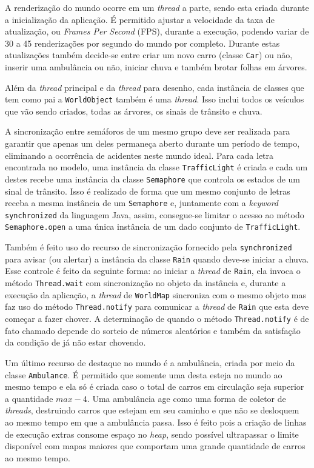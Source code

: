 A renderização do mundo ocorre em um \textit{thread} a parte, sendo
esta criada durante a inicialização da aplicação. É permitido ajustar
a velocidade da taxa de atualização, ou \textit{Frames Per Second} (FPS),
durante a execução, podendo variar de 30 a 45 renderizações por
segundo do mundo por completo. Durante estas atualizações também
decide-se entre criar um novo carro (classe \verb!Car!) ou não,
inserir uma ambulância ou não, iniciar chuva e também brotar folhas em
árvores.

Além da \textit{thread} principal e da \textit{thread} para desenho,
cada instância de classes que tem como pai a \verb!WorldObject! também
é uma \textit{thread}. Isso inclui todos os veículos que vão sendo
criados, todas as árvores, os sinais de trânsito e chuva.

A sincronização entre semáforos de um mesmo grupo deve ser realizada
para garantir que apenas um deles permaneça aberto durante um período
de tempo, eliminando a ocorrência de acidentes neste mundo ideal. Para
cada letra encontrada no modelo, uma instância da classe
\verb!TrafficLight! é criada e cada um destes recebe uma instância da
classe \verb!Semaphore! que controla os estados de um sinal de
trânsito. Isso é realizado de forma que um mesmo conjunto de letras
receba a mesma instância de um \verb!Semaphore! e, juntamente com a
\textit{keyword} \verb!synchronized! da linguagem Java, assim,
consegue-se limitar o acesso ao método \verb!Semaphore.open! a uma
única instância de um dado conjunto de \verb!TrafficLight!.

Também é feito uso do recurso de sincronização fornecido pela
\verb!synchronized! para avisar (ou alertar) a instância da classe
\verb!Rain! quando deve-se iniciar a chuva. Esse controle é feito da
seguinte forma: ao iniciar a \textit{thread} de \verb!Rain!, ela
invoca o método \verb!Thread.wait! com sincronização no objeto da
instância e, durante a execução da aplicação, a \textit{thread} de
\verb!WorldMap! sincroniza com o mesmo objeto mas faz uso do método
\verb!Thread.notify! para comunicar a \textit{thread} de \verb!Rain!
que esta deve começar a fazer chover. A determinação de quando o
método \verb!Thread.notify! é de fato chamado depende do sorteio de
números aleatórios e também da satisfação da condição de já não estar
chovendo.

Um último recurso de destaque no mundo é a ambulância, criada por meio
da classe \verb!Ambulance!. É permitido que somente uma desta esteja
no mundo ao mesmo tempo e ela só é criada caso o total de carros em
circulação seja superior a quantidade $max - 4$. Uma ambulância age
como uma forma de coletor de \textit{threads}, destruindo carros que
estejam em seu caminho e que não se desloquem ao mesmo tempo em que a
ambulância passa. Isso é feito pois a criação de linhas de execução
extras consome espaço no \textit{heap}, sendo possível ultrapassar o
limite disponível com mapas maiores que comportam uma grande
quantidade de carros ao mesmo tempo.%

